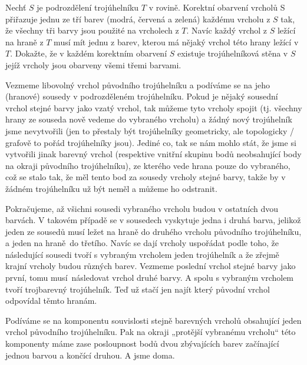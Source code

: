 \documentclass[12pt]{article}					%
\begin{document}
\break

\begin{priklad}[2.3]
	Nechť $S$ je podrozdělení trojúhelníku $T$ v rovině. Korektní obarvení vrcholů S přiřazuje jednu ze tří barev (modrá, červená a zelená) každému vrcholu z $S$ tak, že všechny tři barvy jsou použité na vrcholech z $T$. Navíc každý vrchol z $S$ ležící na hraně z $T$ musí mít jednu z barev, kterou má nějaký vrchol této hrany ležící v $T$. Dokažte, že v každém korektním obarvení $S$ existuje trojúhelníková stěna v $S$ jejíž vrcholy jsou obarveny všemi třemi barvami.

	\begin{dukazin}
		Vezmeme libovolný vrchol původního trojúhelníku a podíváme se na jeho (hranové) sousedy v podrozděleném trojúhelníku. Pokud je nějaký sousední vrchol stejné barvy jako vzatý vrchol, tak můžeme tyto vrcholy spojit (tj. všechny hrany ze souseda nově vedeme do vybraného vrcholu) a žádný nový trojúhelník jsme nevytvořili (jen to přestaly být trojúhelníky geometricky, ale topologicky / grafově to pořád trojúhelníky jsou). Jediné co, tak se nám mohlo stát, že jsme si vytvořili jinak barevný vrchol (respektive vnitřní skupinu bodů neobsahující body na okraji původního trojúhelníku), ze kterého vede hrana pouze do vybraného, což se stalo tak, že měl tento bod za sousedy vrcholy stejné barvy, takže by v žádném trojúhelníku už být neměl a můžeme ho odstranit.

		Pokračujeme, až všichni sousedi vybraného vrcholu budou v ostatních dvou barvách. V takovém případě se v sousedech vyskytuje jedna i druhá barva, jelikož jeden ze sousedů musí ležet na hraně do druhého vrcholu původního trojúhelníku, a jeden na hraně do třetího. Navíc se dají vrcholy uspořádat podle toho, že následující sousedi tvoří s vybraným vrcholem jeden trojúhelník a že zřejmě krajní vrcholy budou různých barev. Vezmeme poslední vrchol stejné barvy jako první, tomu musí následovat vrchol druhé barvy. A spolu s vybraným vrcholem tvoří trojbarevný trojúhelník. Teď už stačí jen najít který původní vrchol odpovídal těmto hranám.
	\end{dukazin}

	\begin{dukazin}
		Podíváme se na komponentu souvislosti stejně barevných vrcholů obsahující jeden vrchol původního trojúhelníku. Pak na okraji „protější vybranému vrcholu“ této komponenty máme zase posloupnost bodů dvou zbývajících barev začínající jednou barvou a končící druhou. A jsme doma.
	\end{dukazin}
\end{priklad}
\end{document}
